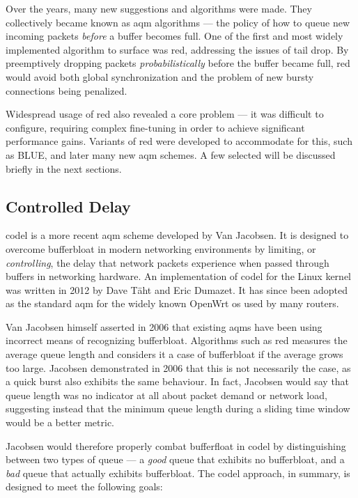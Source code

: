 Over the years, many new suggestions and algorithms were made. They collectively became known as \gls{aqm} algorithms --- the policy of how to queue new incoming packets \textit{before} a buffer becomes full. One of the first and most widely implemented algorithm to surface was \gls{red}, addressing the issues of tail drop. By preemptively dropping packets \textit{probabilistically} before the buffer became full, \gls{red} would avoid both global synchronization and the problem of new bursty connections being penalized. \cite{ieee251892}

Widespread usage of \gls{red} also revealed a core problem --- it was difficult to configure, requiring complex fine-tuning in order to achieve significant performance gains. Variants of \gls{red} were developed to accommodate for this, such as BLUE, and later many new \gls{aqm} schemes. A few selected will be discussed briefly in the next sections.



\subsection{Controlled Delay}

\gls{codel} is a more recent \gls{aqm} scheme developed by Van Jacobsen. It is designed to overcome bufferbloat in modern networking environments by limiting, or \textit{controlling}, the delay that network packets experience when passed through buffers in networking hardware. An implementation of \gls{codel} for the Linux kernel was written in 2012 by Dave Täht and Eric Dumazet. It has since been adopted as the standard \gls{aqm} for the widely known OpenWrt \gls{os} used by many routers.

Van Jacobsen himself asserted in 2006 that existing \gls{aqm}s have been using incorrect means of recognizing bufferbloat. \cite{a_rant_on_queues} Algorithms such as \gls{red} measures the average queue length and considers it a case of bufferbloat if the average grows too large. Jacobsen demonstrated in 2006 that this is not necessarily the case, as a quick burst also exhibits the same behaviour. In fact, Jacobsen would say that queue length was no indicator at all about packet demand or network load, \cite{a_rant_on_queues, controlling_queue_delay} suggesting instead that the minimum queue length during a sliding time window would be a better metric. \cite{controlling_queue_delay}

Jacobsen would therefore properly combat bufferfloat in \gls{codel} by distinguishing between two types of queue --- a \textit{good} queue that exhibits no bufferbloat, and a \textit{bad} queue that actually exhibits bufferbloat. The \gls{codel} approach, in summary, is designed to meet the following goals: \cite{rfc8289}

